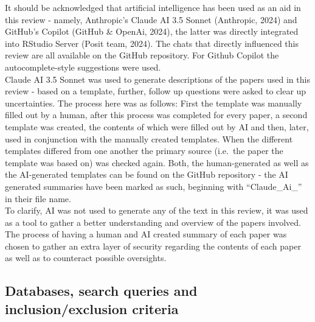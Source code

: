 \documentclass[
  stu,floatsintext]{apa7}
\begin{document}
It should be acknowledged that artificial intelligence has been used as an aid in this review - namely, Anthropic's Claude AI 3.5 Sonnet (Anthropic, 2024) and GitHub's Copilot (GitHub \& OpenAi, 2024), the latter was directly integrated into RStudio Server (Posit team, 2024). The chats that directly influenced this review are all available on the GitHub repository.
For Github Copilot the autocomplete-style suggestions were used.\\
Claude AI 3.5 Sonnet was used to generate descriptions of the papers used in this review - based on a template, further, follow up questions were asked to clear up uncertainties.
The process here was as follows: First the template was manually filled out by a human, after this process was completed for every paper, a second template was created, the contents of which were filled out by AI and then, later, used in conjunction with the manually created templates. When the different templates differed from one another the primary source (i.e.~the paper the template was based on) was checked again. Both, the human-generated as well as the AI-generated templates can be found on the GitHub repository - the AI generated summaries have been marked as such, beginning with ``Claude\_Ai\_'' in their file name.\\
To clarify, AI was not used to generate any of the text in this review, it was used as a tool to gather a better understanding and overview of the papers involved. The process of having a human and AI created summary of each paper was chosen to gather an extra layer of security regarding the contents of each paper as well as to counteract possible oversights.

\subsection{Databases, search queries and inclusion/exclusion criteria}\label{databases-search-queries-and-inclusionexclusion-criteria}
\end{document}
